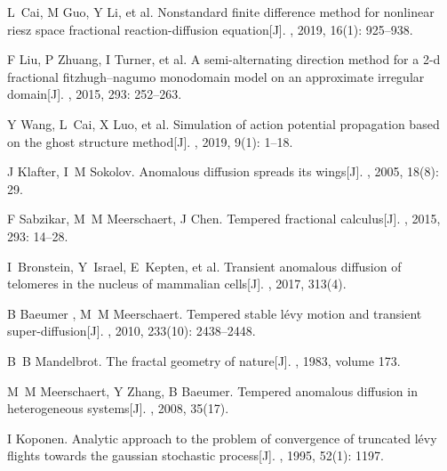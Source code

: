 \documentclass[twoside,UTF8]{nputhesis}
\begin{document}
\begin{thebibliography}{99}
	L~Cai, M Guo, Y Li, et al.
	\newblock Nonstandard finite difference method for nonlinear riesz space
	fractional reaction-diffusion equation[J].
	, 2019, 16(1): 925--938.
	
	F Liu, P Zhuang, I Turner, et al.
	\newblock A semi-alternating direction method for a 2-d fractional
	fitzhugh--nagumo monodomain model on an approximate irregular domain[J].
	, 2015, 293: 252--263.
	
	Y Wang, L~Cai, X Luo, et al.
	\newblock Simulation of action potential propagation based on the ghost
	structure method[J].
	, 2019, 9(1): 1--18.
	
	J Klafter, I~M Sokolov.
	\newblock Anomalous diffusion spreads its wings[J].
	, 2005, 18(8): 29.
	
	F Sabzikar, M~M Meerschaert, J Chen.
	\newblock Tempered fractional calculus[J].
	, 2015, 293: 14--28.
	
	I~Bronstein, Y~Israel, E~Kepten, et al.
	\newblock Transient anomalous diffusion of telomeres in the nucleus of
	mammalian cells[J].
	, 2017, 313(4).
	
	
	
	B Baeumer , M~M Meerschaert.
	\newblock Tempered stable l{\'e}vy motion and transient super-diffusion[J].
	, 2010, 233(10): 2438--2448.
	
	
	B~B Mandelbrot.
	\newblock The fractal geometry of nature[J]. 
	, 1983, volume 173.
	
	
	M~M Meerschaert, Y Zhang, B Baeumer.
	\newblock Tempered anomalous diffusion in heterogeneous systems[J].
	, 2008, 35(17).
	
	I Koponen.
	\newblock Analytic approach to the problem of convergence of truncated l{\'e}vy
	flights towards the gaussian stochastic process[J].
	, 1995, 52(1): 1197.
	

\end{thebibliography}
\end{document}
